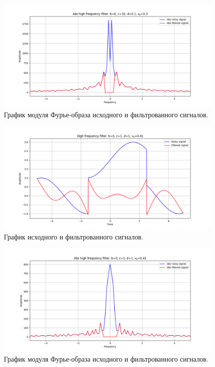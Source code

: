 \documentclass[a4paper, 12pt]{article}
\begin{document}
    \begin{figure}[!htb]
        \centering
        \includegraphics[scale=0.485]{17_abs_u_U_nolow.png}
        \captionsetup{skip=0pt}
        \caption{График модуля Фурье-образа исходного и фильтрованного сигналов.}
        \label{fig:fig60}
    \end{figure}
    \begin{figure}[!htb]
        \centering
        \includegraphics[scale=0.485]{18_u_flt_u_nolow.png}
        \captionsetup{skip=0pt}
        \caption{График исходного и фильтрованного сигналов.}
        \label{fig:fig61}
    \end{figure}
    \begin{figure}[!htb]
        \centering
        \includegraphics[scale=0.485]{18_abs_u_U_nolow.png}
        \captionsetup{skip=0pt}
        \caption{График модуля Фурье-образа исходного и фильтрованного сигналов.}
        \label{fig:fig62}
    \end{figure}
\end{document}
